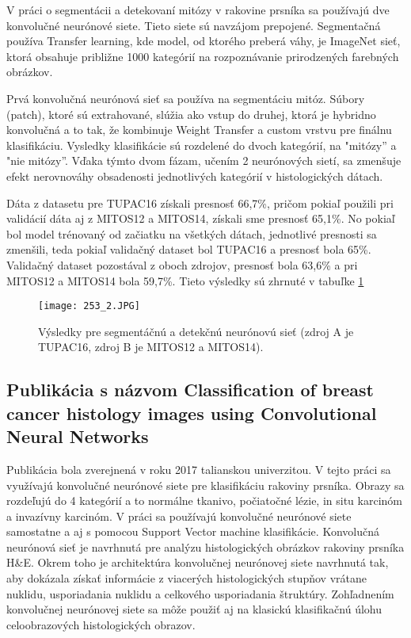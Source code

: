 \documentclass[runningheads]{llncs}
\begin{document}
V práci o segmentácii a detekovaní mitózy v rakovine prsníka sa používajú dve konvolučné neurónové siete. Tieto siete sú navzájom prepojené. Segmentačná používa Transfer learning, kde model, od ktorého preberá váhy, je ImageNet sieť, ktorá obsahuje približne 1000 kategórií na rozpoznávanie prirodzených farebných obrázkov.

Prvá konvolučná neurónová sieť sa používa na segmentáciu mitóz. Súbory (patch), ktoré sú extrahované,  slúžia ako vstup do druhej, ktorá je hybridno konvolučná a to tak, že kombinuje Weight Transfer a custom vrstvu pre finálnu klasifikáciu. Vysledky klasifikácie sú rozdelené do dvoch kategórií, na "mitózy” a "nie mitózy”. Vďaka týmto dvom fázam, učením 2 neurónových sietí, sa zmenšuje efekt nerovnováhy obsadenosti jednotlivých kategórií v histologických dátach.

Dáta z datasetu pre TUPAC16 získali presnosť 66,7\%, pričom pokiaľ použili pri validácií dáta aj z MITOS12 a MITOS14, získali sme presnosť 65,1\%. No pokiaľ bol model trénovaný od začiatku na všetkých dátach, jednotlivé presnosti sa zmenšili, teda pokiaľ validačný dataset bol TUPAC16 a presnosť bola 65\%. Validačný dataset pozostával z oboch zdrojov, presnosť bola 63,6\% a pri MITOS12 a MITOS14 bola 59,7\%. Tieto výsledky sú zhrnuté v tabuľke \ref{fig:SegaDetNN} 

\begin{figure}[h!]
\begin{centering}
\texttt{[image: 253\_2.JPG]}
\par\end{centering}
\caption{Výsledky pre segmentáčnú a detekčnú neurónovú sieť (zdroj A je TUPAC16, zdroj B je MITOS12 a MITOS14). \label{fig:SegaDetNN}\cite{Transferlearningbaseddeep}}
\end{figure}

\subsection{Publikácia s názvom Classification of  breast cancer histology images using Convolutional Neural Networks \cite{ClassificationBreastCancer}}

Publikácia bola zverejnená v roku 2017 talianskou univerzitou.  V  tejto práci sa využívajú konvolučné neurónové siete pre klasifikáciu rakoviny prsníka. Obrazy sa rozdeľujú do 4 kategórií a to normálne tkanivo, počiatočné lézie, in situ karcinóm a invazívny karcinóm. V práci sa používajú konvolučné neurónové siete samostatne a aj s pomocou Support Vector machine klasifikácie. Konvolučná neurónová sieť je navrhnutá pre analýzu histologických obrázkov rakoviny prsníka H\&E. Okrem toho je architektúra konvolučnej neurónovej siete navrhnutá tak, aby dokázala získať informácie z viacerých histologických stupňov vrátane nuklidu, usporiadania nuklidu  a celkového usporiadania štruktúry. Zohľadnením  konvolučnej neurónovej siete sa môže použiť aj na klasickú klasifikačnú úlohu celoobrazových histologických obrazov.
\end{document}
